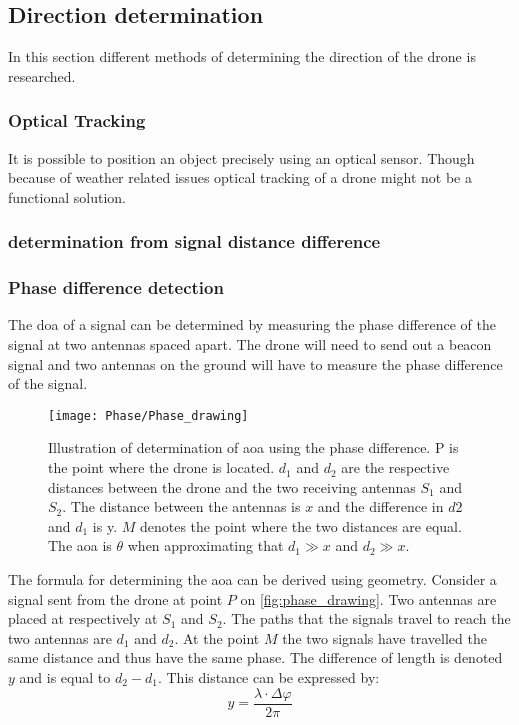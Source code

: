 \clearpage
\subsection{Direction determination}
In this section different methods of determining the direction of the drone is researched. 

\subsubsection{Optical Tracking}
It is possible to position an object precisely using an optical sensor. Though because of weather related issues optical tracking of a drone might not be a functional solution. 


\subsubsection{ determination from signal distance difference}








\subsubsection{Phase difference detection}
The \gls{doa} of a signal can be determined by measuring the phase difference of the signal at two antennas spaced apart.
The drone will need to send out a beacon signal and two antennas on the ground will have to measure the phase difference of the signal. 

\begin{figure}[h]
\centering
\texttt{[image: Phase/Phase\_drawing]}
\caption{Illustration of determination of \gls{aoa} using the phase difference. P is the point where the drone is located. $d_1$ and $d_2$ are the respective distances between the drone and the two receiving antennas $S_1$ and $S_2$. The distance between the antennas is $x$ and the difference in $d2$ and $d_1$ is y. $M$ denotes the point where the two distances are equal. The \gls{aoa} is $\theta$ when approximating that $d_1 \gg x$ and $d_2 \gg x$.}
\label{fig:phase_drawing}
\end{figure}


The formula for determining the \gls{aoa} can be derived using geometry.
Consider a signal sent from the drone at point $P$ on \autoref{fig:phase_drawing}. Two antennas are placed at respectively at $S_1$ and $S_2$. The paths that the signals travel to reach the two antennas are $d_1$ and $d_2$. At the point $M$ the two signals have travelled the same distance and thus have the same phase. 
The difference of length is denoted $y$ and is equal to $d_2-d_1$. This distance can be expressed by:
\begin{equation} \label{eq:phasedaoay}
y=\frac{\lambda\cdot\Delta\varphi}{2\pi}
\end{equation}
\startexplain
{}
\stopexplain

